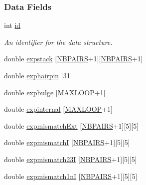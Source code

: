 \subsubsection*{Data Fields}
\begin{DoxyCompactItemize}
\item 
int \mbox{\hyperlink{group__energy__parameters_a378d5bcf2bae1f3ec84c912c7d3908d2}{id}}
\begin{DoxyCompactList}\small\item\em An identifier for the data structure. \end{DoxyCompactList}\item 
double \mbox{\hyperlink{group__energy__parameters_a0b288e466e25d1c4f45d138236b5a544}{expstack}} \mbox{[}\mbox{\hyperlink{energy__const_8h_a5e75221c779d618eab81e096f37e32ce}{N\+B\+P\+A\+I\+RS}}+1\mbox{]}\mbox{[}\mbox{\hyperlink{energy__const_8h_a5e75221c779d618eab81e096f37e32ce}{N\+B\+P\+A\+I\+RS}}+1\mbox{]}
\item 
double \mbox{\hyperlink{group__energy__parameters_a7d770c6dbf7bd37b91f56600d387b0cd}{exphairpin}} \mbox{[}31\mbox{]}
\item 
double \mbox{\hyperlink{group__energy__parameters_a7f2f16246bbfc5b009e4c34113dcacd7}{expbulge}} \mbox{[}\mbox{\hyperlink{energy__const_8h_ad1bd6eabac419670ddd3c9ed82145988}{M\+A\+X\+L\+O\+OP}}+1\mbox{]}
\item 
double \mbox{\hyperlink{group__energy__parameters_aa98c3f4a62b997c9a460876c75d2d1ea}{expinternal}} \mbox{[}\mbox{\hyperlink{energy__const_8h_ad1bd6eabac419670ddd3c9ed82145988}{M\+A\+X\+L\+O\+OP}}+1\mbox{]}
\item 
double \mbox{\hyperlink{group__energy__parameters_a2fe9cc842350991d96b341804522a0d1}{expmismatch\+Ext}} \mbox{[}\mbox{\hyperlink{energy__const_8h_a5e75221c779d618eab81e096f37e32ce}{N\+B\+P\+A\+I\+RS}}+1\mbox{]}\mbox{[}5\mbox{]}\mbox{[}5\mbox{]}
\item 
double \mbox{\hyperlink{group__energy__parameters_aac2d7b3c327c7125be000e8328fca606}{expmismatchI}} \mbox{[}\mbox{\hyperlink{energy__const_8h_a5e75221c779d618eab81e096f37e32ce}{N\+B\+P\+A\+I\+RS}}+1\mbox{]}\mbox{[}5\mbox{]}\mbox{[}5\mbox{]}
\item 
double \mbox{\hyperlink{group__energy__parameters_afed2655b9a16a362fc22d270bfe3a5ab}{expmismatch23I}} \mbox{[}\mbox{\hyperlink{energy__const_8h_a5e75221c779d618eab81e096f37e32ce}{N\+B\+P\+A\+I\+RS}}+1\mbox{]}\mbox{[}5\mbox{]}\mbox{[}5\mbox{]}
\item 
double \mbox{\hyperlink{group__energy__parameters_ae64727c998a64d8a6f958ef364eda821}{expmismatch1nI}} \mbox{[}\mbox{\hyperlink{energy__const_8h_a5e75221c779d618eab81e096f37e32ce}{N\+B\+P\+A\+I\+RS}}+1\mbox{]}\mbox{[}5\mbox{]}\mbox{[}5\mbox{]}

\end{DoxyCompactItemize}

